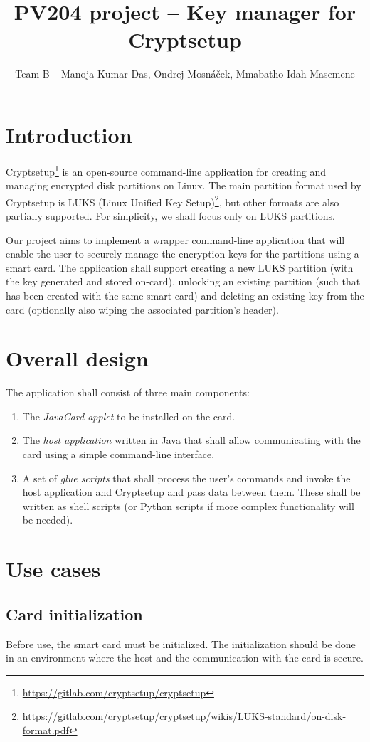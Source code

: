 \documentclass[10pt,a4paper]{article}
\author{Team B -- Manoja Kumar Das, Ondrej Mosnáček, Mmabatho Idah Masemene}
\title{PV204 project -- Key manager for Cryptsetup}
\begin{document}
\maketitle

\section{Introduction}
Cryptsetup\footnote{\url{https://gitlab.com/cryptsetup/cryptsetup}} is an open-source command-line application for creating and managing encrypted disk partitions on Linux. The main partition format used by Cryptsetup is LUKS (Linux Unified Key Setup)\footnote{\url{https://gitlab.com/cryptsetup/cryptsetup/wikis/LUKS-standard/on-disk-format.pdf}}, but other formats are also partially supported. For simplicity, we shall focus only on LUKS partitions.

Our project aims to implement a wrapper command-line application that will enable the user to securely manage the encryption keys for the partitions using a smart card. The application shall support creating a new LUKS partition (with the key generated and stored on-card), unlocking an existing partition (such that has been created with the same smart card) and deleting an existing key from the card (optionally also wiping the associated partition's header).

\section{Overall design}
The application shall consist of three main components:
\begin{enumerate}
\item The \emph{JavaCard applet} to be installed on the card.
\item The \emph{host application} written in Java that shall allow communicating with the card using a simple command-line interface.
\item A set of \emph{glue scripts} that shall process the user's commands and invoke the host application and Cryptsetup and pass data between them. These shall be written as shell scripts (or Python scripts if more complex functionality will be needed).
\end{enumerate}

\section{Use cases}
\subsection{Card initialization} \label{init}
Before use, the smart card must be initialized. The initialization should be done in an environment where the host and the communication with the card is secure.
\end{document}
